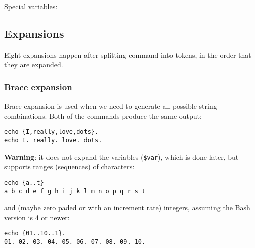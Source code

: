 Special variables:

\subsection{Expansions}
Eight expansions happen after splitting command into tokens, in the order that they are expanded.

\subsubsection{Brace expansion}
Brace expansion is used when we need to generate all possible string combinations.
Both of the commands produce the same output:
\begin{verbatim}
echo {I,really,love,dots}.
echo I. really. love. dots.
\end{verbatim}

\textbf{Warning}: it does not expand the variables (\texttt{\$var}), which is done later, but supports ranges (sequences) of characters:
\begin{verbatim}
echo {a..t}
a b c d e f g h i j k l m n o p q r s t
\end{verbatim}

and (maybe zero paded or with an increment rate) integers, assuming the Bash version is 4 or newer:

\begin{verbatim}
echo {01..10..1}.
01. 02. 03. 04. 05. 06. 07. 08. 09. 10.
\end{verbatim}

